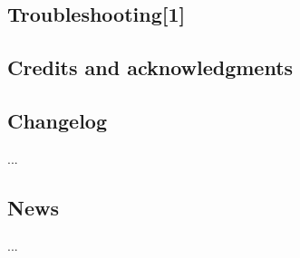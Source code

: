 \subsection*{Troubleshooting\mbox{[}1\mbox{]}}

\subsection*{Credits and acknowledgments}

\subsection*{Changelog}

...

\subsection*{News}

... 